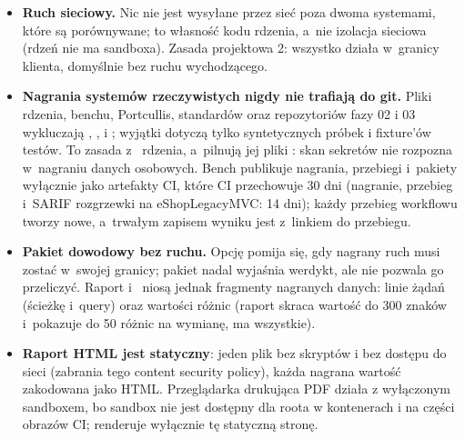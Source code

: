 \begin{itemize}
  \item \textbf{Ruch sieciowy.} Nic nie jest wysyłane przez sieć poza dwoma systemami,
        które są porównywane; to własność kodu rdzenia, a~nie izolacja sieciowa (rdzeń nie
        ma sandboxa). Zasada projektowa 2: wszystko działa w~granicy klienta,
        domyślnie bez ruchu wychodzącego.
  \item \textbf{Nagrania systemów rzeczywistych nigdy nie trafiają do git.} Pliki
         rdzenia, benchu, Portcullis, standardów oraz repozytoriów
        fazy 02 i 03 wykluczają , , 
        i ; wyjątki dotyczą tylko syntetycznych próbek i fixture'ów
        testów. To zasada z~ rdzenia, a~pilnują jej pliki
        : skan sekretów nie rozpozna w~nagraniu danych osobowych. Bench
        publikuje nagrania, przebiegi i~pakiety wyłącznie jako artefakty CI, które CI
        przechowuje 30 dni (nagranie, przebieg i~SARIF rozgrzewki na eShopLegacyMVC: 14 dni);
        każdy przebieg workflowu tworzy nowe, a~trwałym zapisem wyniku jest
         z~linkiem do przebiegu.
  \item \textbf{Pakiet dowodowy bez ruchu.} Opcję  pomija się, gdy nagrany
        ruch musi zostać w~swojej granicy; pakiet nadal wyjaśnia werdykt, ale nie pozwala go
        przeliczyć. Raport i~ niosą jednak fragmenty nagranych danych:
        linie żądań (ścieżkę i~query) oraz wartości różnic (raport skraca wartość do 300
        znaków i~pokazuje do 50 różnic na wymianę,  ma wszystkie).
  \item \textbf{Raport HTML jest statyczny}: jeden plik bez skryptów i bez dostępu do sieci
        (zabrania tego content security policy), każda nagrana wartość zakodowana jako HTML.
        Przeglądarka drukująca PDF działa z wyłączonym sandboxem, bo sandbox nie jest
        dostępny dla roota w kontenerach i na części obrazów CI; renderuje wyłącznie tę
        statyczną stronę.
\end{itemize}

